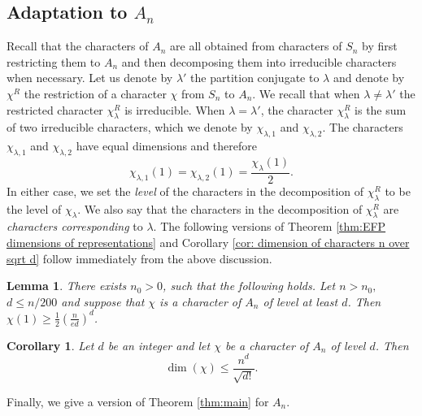 \documentclass[11pt, letterpaper]{amsart}
\newtheorem{lem}[thm]{Lemma}
\newtheorem{cor}[thm]{Corollary}
\renewcommand\ge{\geqslant}
\renewcommand\le{\leqslant}
\begin{document}
\subsection{Adaptation to $A_n$}\label{sec:adaptations}

Recall that the characters of $A_n$ are all obtained from characters of $S_n$ by first restricting them to $A_n$ and then decomposing them into irreducible characters when necessary.
Let us denote by $\lambda'$ the partition conjugate to $\lambda$ and denote by $\chi^{R}$ the restriction of a character $\chi$ from $S_n$ to $A_n$. We recall that when $\lambda\ne \lambda'$ the restricted character $\chi_{\lambda}^R$ is irreducible. When $\lambda =\lambda'$, the character $\chi_{\lambda}^R$ is the sum of two irreducible characters, which we denote by $\chi_{\lambda,1}$ and $\chi_{\lambda,2}$. The characters $\chi_{\lambda,1}$ and $\chi_{\lambda,2}$ have equal dimensions and therefore
\[
\chi_{\lambda,1}(1) = \chi_{\lambda,2}(1) =\frac{\chi_{\lambda}(1)}{2}. 
\]
In either case, we set the \emph{level} of the characters in the decomposition of $\chi_{\lambda}^R$ to be the level of $\chi_{\lambda}$. We also say that the characters in the decomposition of $\chi_{\lambda}^R$ are \emph{characters corresponding} to $\lambda$. The following versions of Theorem \ref{thm:EFP dimensions of representations} and Corollary \ref{cor: dimension of characters n over sqrt d} follow immediately from the above discussion. 

\begin{lem}\label{lem: dimension of characters A_n}
There exists $n_0>0$, such that the following holds. Let $n>n_0,$ $d\le n/200$ and suppose that $\chi$ is a character of $A_n$ of level at least $d$. Then $\chi(1) \ge \frac{1}{2}\left(\frac{n}{ed}\right)^d$. %
\end{lem}

\begin{cor}\label{cor: dimension of characters n over sqrt d A_n}
        Let $d$ be an integer and let $\chi$ be a character of $A_n$ of level $d$. Then
    \[\dim(\chi) \le \frac{n^d}{\sqrt{d!}}.\]
\end{cor}

Finally, we give a version of Theorem \ref{thm:main} for $A_n$. 
\end{document}

